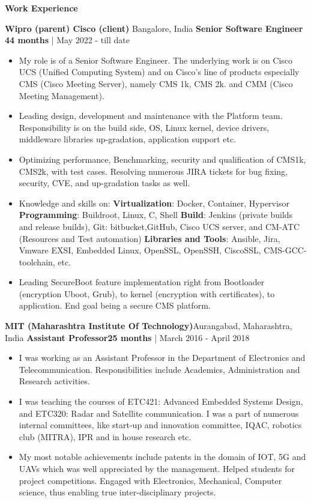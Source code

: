 \begin{center}
    \textbf{Work Experience}
\end{center}

\textbf{Wipro (parent) Cisco (client)} \hfill{Bangalore, India}
\newline
\textbf{Senior Software Engineer} \hfill{\textbf{44 months} | May 2022 - till date}
\begin{itemize}
    \item {My role is  of a Senior Software Engineer. The underlying work is on Cisco UCS (Unified Computing System) and on Cisco's line of products especially CMS (Cisco Meeting Server), namely CMS 1k, CMS 2k. and CMM (Cisco Meeting Management).}
    \item{Leading design, development and maintenance with the Platform team. Responsibility is on the build side, OS, Linux kernel, device drivers, middleware libraries up-gradation, application support etc.}
    \item {Optimizing performance, Benchmarking, security and qualification of CMS1k, CMS2k, with test cases. Resolving numerous JIRA tickets for bug fixing, security, CVE, and up-gradation tasks as well.}
    \item {Knowledge and skills on: \textbf{Virtualization}: Docker, Container, Hypervisor \textbf{Programming}: Buildroot, Linux, C, Shell \textbf{Build}: Jenkins (private builds and release builds), Git: bitbucket,GitHub, Cisco UCS server, and CM-ATC (Resources and Test automation) \textbf{Libraries and Tools}: Ansible, Jira, Vmware EXSI, Embedded Linux, OpenSSL, OpenSSH, CiscoSSL, CMS-GCC-toolchain, etc.}
    \item {Leading SecureBoot feature implementation right from Bootloader (encryption Uboot, Grub), to kernel (encryption with certificates), to application. End goal being a secure CMS platform.}
\end{itemize}

\vspace{12pt}

\textbf{MIT (Maharashtra Institute Of Technology)}\hfill{Aurangabad, Maharashtra, India}
\newline
\textbf{Assistant Professor}\hfill{\textbf{25 months} | March 2016 - April 2018}
            \begin{itemize}
             \item {I was working as an Assistant Professor in the Department of Electronics and Telecommunication.
             Responsibilities include Academics, Administration and Research activities.}
             \item {I was teaching the courses of ETC421: Advanced Embedded Systems Design, and ETC320: Radar and Satellite communication. I was a part of numerous internal committees, like start-up and innovation committee, IQAC, robotics club (MITRA), IPR and in house research etc.}
                \item {My most notable achievements include patents in the domain of IOT, 5G and UAVs which was well appreciated by the management. Helped students for project competitions. Engaged with Electronics, Mechanical, Computer science, thus enabling true inter-disciplinary projects.}
            \end{itemize}

